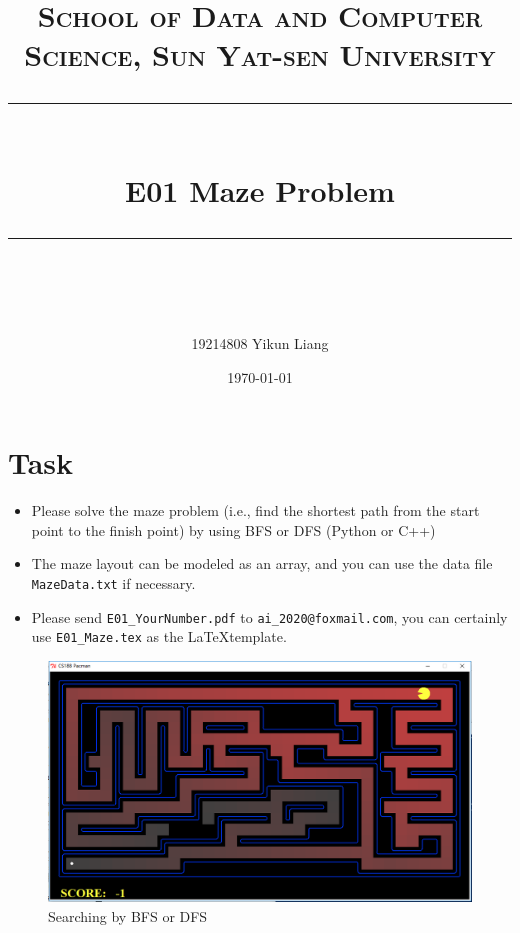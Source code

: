 \documentclass[a4paper, 11pt]{article}
\title{	
\normalfont \normalsize
\textsc{School of Data and Computer Science, Sun Yat-sen University} \\ [25pt] %
\rule{\textwidth}{0.5pt} \\[0.4cm] %
\huge  E01 Maze Problem\\ %
\rule{\textwidth}{2pt} \\[0.5cm] %
\author{19214808 Yikun Liang}
\date{\normalsize\today}
}
\begin{document}
\maketitle
\tableofcontents
\newpage
\section{Task}



\begin{itemize}
	\item Please solve the maze problem (i.e., find the shortest path from the start point to the finish point) by using BFS or DFS (Python or C++)
	\item The maze layout can be modeled as an array, and you can use the data file \texttt{MazeData.txt} if necessary.
	\item Please send \texttt{E01\_YourNumber.pdf} to \texttt{ai\_2020@foxmail.com}, you can certainly use \texttt{E01\_Maze.tex} as the \LaTeX template.
\end{itemize}

\begin{figure}[ht]
\centering
\includegraphics[width=15cm]{Pic/Pacman}

\caption{Searching by BFS or DFS}
\end{figure}
\end{document}
